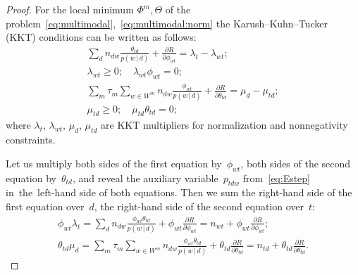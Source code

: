 \documentclass{acm_proc_article-sp}
\newcommand{\cond}{\mspace{3mu}{|}\mspace{3mu}}
\begin{document}
\begin{proof}
    For the local minimum $\Phi^m,\Theta$
    of the problem~\eqref{eq:multimodal},~\eqref{eq:multimodal:norm}
    the Karush--Kuhn--Tucker (KKT) conditions can be written as follows:
    \begin{gather*}
        \sum_{d} n_{dw} \frac{\theta_{td}}{p(w\cond d)} + \frac{\partial R}{\partial \phi_{wt}}
        = \lambda_t - \lambda_{wt};
    \\
        \lambda_{wt}\geq 0;
        \quad
        \lambda_{wt}\phi_{wt} = 0;
    \\
        \sum_{m} \tau_m \!\!\sum_{w\in W^m}\!\! n_{dw} \frac{\phi_{wt}}{p(w\cond d)} + \frac{\partial R}{\partial \theta_{td}}
        = \mu_d - \mu_{td};
    \\
        \mu_{td}\geq 0;
        \quad
        \mu_{td}\theta_{td} = 0;
    \end{gather*}
    where $\lambda_t$, $\lambda_{wt}$, $\mu_d$, $\mu_{td}$
    are KKT multipliers for normalization and nonnegativity constraints.

    Let us multiply
    both sides of the first equation by~$\phi_{wt}$,
    both sides of the second equation by~$\theta_{td}$,
    and reveal the auxiliary variable~$p_{tdw}$ from~\eqref{eq:Estep}
    in~the~left-hand side of both equations.
    Then we sum
    the right-hand side of the first equation over~$d$,
    the right-hand side of the second equation over~$t$:
    \begin{gather*}
        \phi_{wt} \lambda_t
        =
        \sum_{d}
        n_{dw} \frac{\phi_{wt}\theta_{td}}{p(w\cond d)}
        + \phi_{wt} \frac{\partial R}{\partial \phi_{wt}}
        =
        n_{wt} + \phi_{wt} \frac{\partial R}{\partial \phi_{wt}};
    \\
        \theta_{td} \mu_{d}
        =
        \sum_{m} \tau_m \!\!\!\sum_{w\in W^m}\!\!\!
        n_{dw} \frac{\phi_{wt}\theta_{td}}{p(w\cond d)}
        + \theta_{td} \frac{\partial R}{\partial \theta_{td}}
        =
        n_{td} + \theta_{td} \frac{\partial R}{\partial \theta_{td}}.
    \end{gather*}


\end{proof}
\end{document}
